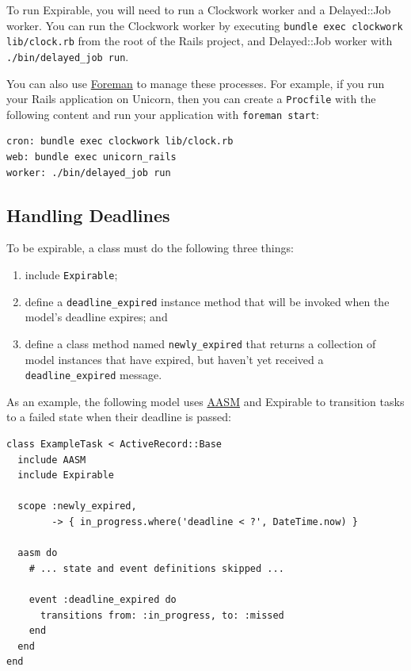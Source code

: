 \documentclass[document.tex]{subfiles}
\begin{document}
To run Expirable, you will need to run a Clockwork worker and a Delayed::Job worker.
You can run the Clockwork worker by executing {\tt bundle exec clockwork lib/clock.rb}
from the root of the Rails project, and Delayed::Job worker with {\tt ./bin/delayed\_job run}.

You can also use \href{http://blog.daviddollar.org/2011/05/06/introducing-foreman.html}{Foreman}
to manage these processes. For example, if you run your Rails application on Unicorn, then
you can create a {\tt Procfile} with the following content and run your application with {\tt foreman start}:

\begin{lstlisting}
cron: bundle exec clockwork lib/clock.rb
web: bundle exec unicorn_rails
worker: ./bin/delayed_job run

\end{lstlisting}   %

\subsection{Handling Deadlines}

To be expirable, a class must do the following three things:

\begin{enumerate}
\item include {\tt Expirable};
\item define a {\tt deadline\_expired} instance method that will be invoked when the model's deadline expires; and
\item define a class method named {\tt newly\_expired} that returns a collection of model instances that have expired, but haven't yet received a {\tt deadline\_expired} message.
\end{enumerate}

\pagebreak

As an example, the following model uses \href{https://github.com/aasm/aasm}{AASM} and Expirable to transition tasks to a failed state when their deadline is passed:

\begin{lstlisting}
class ExampleTask < ActiveRecord::Base
  include AASM
  include Expirable
  
  scope :newly_expired,
        -> { in_progress.where('deadline < ?', DateTime.now) }

  aasm do
    # ... state and event definitions skipped ...

    event :deadline_expired do
      transitions from: :in_progress, to: :missed
    end
  end
end

\end{lstlisting}   %
\end{document}
